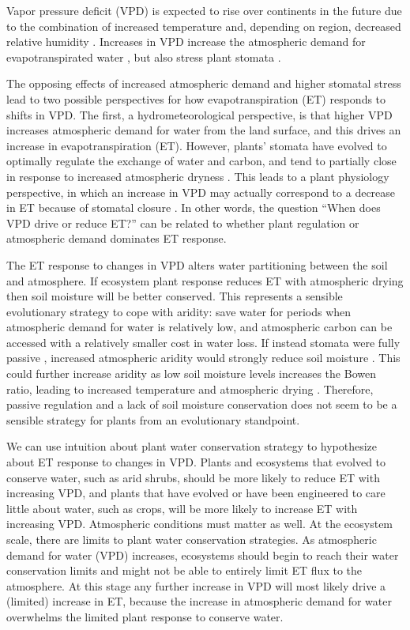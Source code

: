 Vapor pressure deficit (VPD) is expected to rise over continents in
the future due to the combination of increased temperature and,
depending on region, decreased relative humidity
\citep{Byrne_2013}. Increases in VPD increase the atmospheric demand
for evapotranspirated water \citep{Penman_1948, Monteith_1965}, but
also stress plant stomata \citep{Leuning_1990, MEDLYN_2011}.

The opposing effects of increased atmospheric demand and higher
stomatal stress lead to two possible perspectives for how
evapotranspiration (ET) responds to shifts in VPD. The first, a
hydrometeorological perspective, is that higher VPD increases
atmospheric demand for water from the land surface, and this drives an
increase in evapotranspiration (ET). However, plants' stomata have
evolved to optimally regulate the exchange of water and carbon, and
tend to partially close in response to increased atmospheric dryness
\citep{Farquhar_1978, Ball_1987, Leuning_1990, MEDLYN_2011}. This
leads to a plant physiology perspective, in which an increase in VPD
may actually correspond to a decrease in ET because of stomatal
closure \citep[e.g.][]{Rigden_2017}.  In other words, the question
``When does VPD drive or reduce ET?'' can be related to whether plant
regulation or atmospheric demand dominates ET response.

The ET response to changes in VPD alters water partitioning between
the soil and atmosphere. If ecosystem plant response reduces ET with
atmospheric drying then soil moisture will be better conserved. This
represents a sensible evolutionary strategy to cope with aridity: save
water for periods when atmospheric demand for water is relatively low,
and atmospheric carbon can be accessed with a relatively smaller cost
in water loss. If instead stomata were fully passive \citep [similar
to soil pores, e.g. ][]{Or_2013}, increased atmospheric aridity would
strongly reduce soil moisture \citep{Berg_2017}. This could further
increase aridity as low soil moisture levels increases the Bowen
ratio, leading to increased temperature and atmospheric drying
\citep[][]{Bouchet_1963, Morton_1965, Brutsaert_1999, Ozdogan_2006,
  Salvucci_2013, Gentine_2016, Berg_2016}. Therefore, passive
regulation and a lack of soil moisture conservation does not seem to
be a sensible strategy for plants from an evolutionary standpoint.

We can use intuition about plant water conservation strategy to
hypothesize about ET response to changes in VPD. Plants and ecosystems
that evolved to conserve water, such as arid shrubs, should be more
likely to reduce ET with increasing VPD, and plants that have evolved
or have been engineered to care little about water, such as crops,
will be more likely to increase ET with increasing VPD. Atmospheric
conditions must matter as well. At the ecosystem scale, there are
limits to plant water conservation strategies. As atmospheric demand
for water (VPD) increases, ecosystems should begin to reach their
water conservation limits and might not be able to entirely limit ET
flux to the atmosphere. At this stage any further increase in VPD will
most likely drive a (limited) increase in ET, because the increase in
atmospheric demand for water overwhelms the limited plant response to
conserve water.

